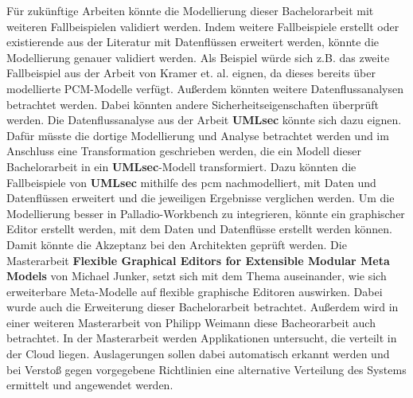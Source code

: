 Für zukünftige Arbeiten könnte die Modellierung dieser Bachelorarbeit mit weiteren Fallbeispielen validiert werden. Indem weitere Fallbeispiele erstellt oder existierende aus der Literatur mit Datenflüssen erweitert werden, könnte die Modellierung genauer validiert werden. Als Beispiel würde sich z.B. das zweite Fallbeispiel aus der Arbeit von Kramer et. al. \cite{Kramera} eignen, da dieses bereits über modellierte PCM-Modelle verfügt. Außerdem könnten weitere Datenflussanalysen betrachtet werden. Dabei könnten andere Sicherheitseigenschaften überprüft werden. Die Datenflussanalyse aus der Arbeit \textbf{UMLsec} \cite{Jurjens2005} könnte sich dazu eignen. Dafür müsste die dortige Modellierung und Analyse betrachtet werden und im Anschluss eine Transformation geschrieben werden, die ein Modell dieser Bachelorarbeit in ein \textbf{UMLsec}-Modell transformiert. Dazu könnten die Fallbeispiele von \textbf{UMLsec} mithilfe des \gls{pcm} nachmodelliert, mit Daten und Datenflüssen erweitert und die jeweiligen Ergebnisse verglichen werden. Um die Modellierung besser in Palladio-Workbench zu integrieren, könnte ein graphischer Editor erstellt werden, mit dem Daten und Datenflüsse erstellt werden können. Damit könnte die Akzeptanz bei den Architekten geprüft werden. Die Masterarbeit \textbf{Flexible Graphical Editors for Extensible Modular Meta Models} von Michael Junker, setzt sich mit dem Thema auseinander, wie sich erweiterbare Meta-Modelle auf flexible graphische Editoren auswirken. Dabei wurde auch die Erweiterung dieser Bachelorarbeit betrachtet. Außerdem wird in einer weiteren Masterarbeit von Philipp Weimann diese Bacheorarbeit auch betrachtet. In der Masterarbeit werden Applikationen untersucht, die verteilt in der Cloud liegen. Auslagerungen sollen dabei automatisch erkannt werden und bei Verstoß gegen vorgegebene Richtlinien eine alternative Verteilung des Systems ermittelt und angewendet werden.


